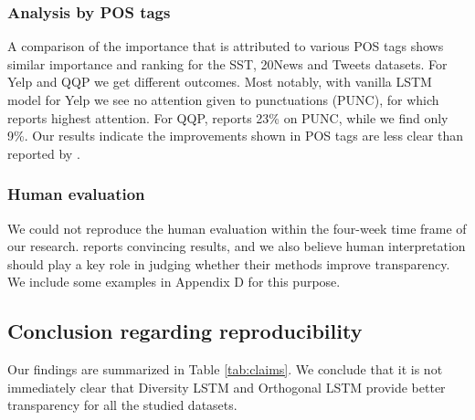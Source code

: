 \subsubsection{Analysis by POS tags}

A comparison of the importance that is attributed to various POS tags shows similar importance and ranking for the SST, 20News and Tweets datasets. For Yelp and QQP we get different outcomes. Most notably, with vanilla LSTM model for Yelp we see no attention given to punctuations (PUNC), for which \citet{mohankumar_towards_2020} reports highest attention. For QQP, \citet{mohankumar_towards_2020} reports 23\% on PUNC, while we find only 9\%. 
Our results indicate the improvements shown in POS tags are less clear than reported by \citet{mohankumar_towards_2020}.

\subsubsection{Human evaluation} We could not reproduce the human evaluation within the four-week time frame of our research.
\citet{mohankumar_towards_2020} reports convincing results, and we also believe human interpretation should play a key role in judging whether their methods improve transparency. We include some examples in Appendix D for this purpose.

\subsection{Conclusion regarding reproducibility} Our findings are summarized in Table \ref{tab:claims}. We conclude that it is not immediately clear that Diversity LSTM and Orthogonal LSTM provide better transparency for all the studied datasets. 

